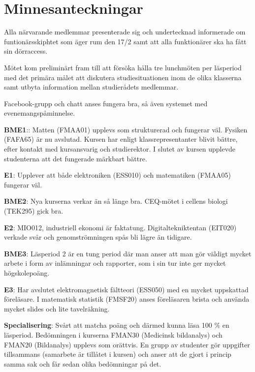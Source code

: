 \documentclass[10pt]{article}
\begin{document}
\section*{Minnesanteckningar}
\begin{paragrafer}
Alla närvarande medlemmar presenterade sig och undertecknad informerade om funtionärsskiphtet som äger rum den 17/2 samt att alla funktionärer ska ha fått sin dörraccess. 

Mötet kom preliminärt fram till att försöka hålla tre lunchmöten per läsperiod med det primära målet att diskutera studiesituationen inom de olika klasserna samt utbyta information mellan studierådets medlemmar.

Facebook-grupp och chatt anses fungera bra, så även systemet med evenemangspåminnelse.

\textbf{BME1}:: Matten (FMAA01) upplevs som strukturerad och fungerar väl. Fysiken  (FAFA65) är nu avslutad. Kursen har enligt klassrepresentanter blivit bättre, efter kontakt med kursansvarig och studierektor. I slutet av kursen upplevde studenterna att det fungerade märkbart bättre. 

\textbf{E1}: Upplever att både elektroniken (ESS010) och matematiken (FMAA05) fungerar väl.

\textbf{BME2}: Nya kurserna verkar än så länge bra. CEQ-mötet i cellens biologi (TEK295) gick bra.
 
\textbf{E2}: MIO012, industriell ekonomi är faktatung. Digitaltekniktentan (EIT020) verkade svår och genomströmningen spås bli lägre än tidigare.

\textbf{BME3}: Läsperiod 2 är en tung period där man anser att man gör väldigt mycket arbete i form av inlämningar och rapporter, som i sin tur inte ger mycket högskolepoäng.

\textbf{E3}: Har avslutet elektromagnetisk fältteori (ESS050) med en mycket uppskattad föreläsare. I matematisk statistik (FMSF20) anses föreläsaren brista och använda mycket slides och lite tavelräkning.    

\textbf{Specialisering}: Svårt att matcha poäng och därmed kunna läsa 100 \% en läsperiod. 
Bedömningen i kurserna FMAN30 (Medicinsk bildanalys) och FMAN20 (Bildanalys) upplevs som orättvis. En grupp av studenter gör uppgifter tillsammans (samarbete är tillåtet i kursen) och anser att de gjort i princip samma sak och får sedan olika bedömningar på det. 


\end{paragrafer}
\end{document}
